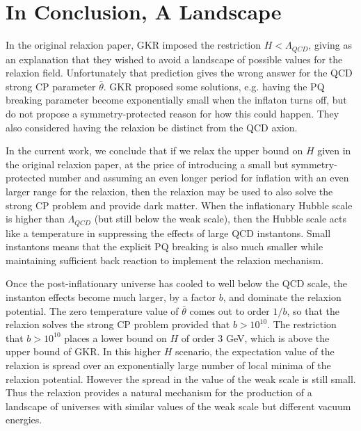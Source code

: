 \documentclass[12pt,aps,prd,showpacs,notitlepage,nofootinbib]{revtex4-1}
\begin{document}
\section{In Conclusion, A Landscape}
In the original relaxion paper, GKR imposed the restriction $H<\Lambda_{QCD}$, giving as an explanation that they wished to avoid a landscape of possible values for the relaxion field. Unfortunately that prediction gives the wrong answer for the QCD strong CP parameter $\bar\theta$. GKR proposed some solutions, e.g. having the PQ breaking parameter become exponentially small when the inflaton turns off, but do not propose a symmetry-protected reason for how this could happen. They also considered having the relaxion be distinct from the QCD axion. 

In the current work, we conclude that if we relax the upper bound on $H$ given in the original relaxion paper, at the price of introducing a small but symmetry-protected number and assuming an even longer period for inflation with an even larger range for the relaxion, then the relaxion may be used to also solve the strong CP problem and provide dark matter.  When the inflationary Hubble scale is higher than $\Lambda_{QCD}$ (but still below the weak scale), then the Hubble scale acts like a temperature in suppressing the effects of large QCD instantons. Small instantons means that the  explicit PQ breaking is also much smaller while maintaining sufficient back reaction to implement the relaxion mechanism. 

Once the post-inflationary universe has cooled to well below the QCD scale, the instanton effects become much larger, by a factor $b$, and dominate the relaxion potential. The 
 zero temperature value of $\bar\theta$ comes out to order $1/b$, so that the relaxion solves the strong CP problem provided that $b> 10^{10}$. The restriction that $b>10^{10}$ places a lower bound on $H$ of order 3 GeV, which is above the upper bound of GKR. In this higher $H$ scenario, the expectation value of the relaxion is spread over an exponentially large number of local minima of  the relaxion potential.   However the spread in the value of the weak scale is still   small.  Thus the relaxion provides a natural mechanism for the production of a landscape of universes with similar values of the weak scale but different vacuum energies. 
\end{document}
